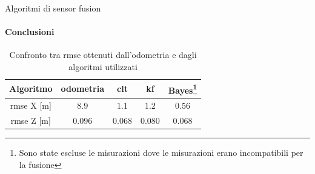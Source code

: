 \documentclass{beamer}
\begin{document}
\begin{frame}{Algoritmi di sensor fusion}
\framesubtitle{Conclusioni}
\begin{table}[h]
    \centering
    \begin{tabular}{|c|c|c|c|c|}
    \hline
        Algoritmo &  odometria & clt & kf & Bayes\footnote{Sono state escluse le misurazioni dove le misurazioni erano incompatibili per la fusione} \\
        \hline
        rmse X [m] & $8.9$ & $1.1$ & $1.2$ & $0.56$ \\
        \hline
        rmse Z [m] & $0.096$ & $0.068$ & $0.080$ & $0.068$\\
        \hline
    \end{tabular}
    \caption{Confronto tra rmse ottenuti dall'odometria e dagli algoritmi utilizzati}
\end{table}
    
\end{frame}
\end{document}
